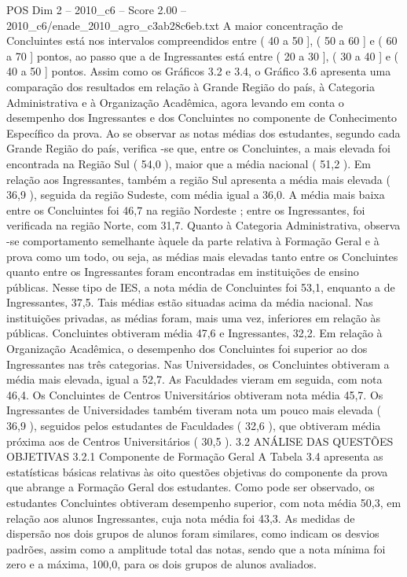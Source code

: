 \begin{textsample}{POS Dim 2 – 2010\_c6 – Score 2.00 – 2010\_c6/enade\_2010\_agro\_c3ab28c6eb.txt}
A maior concentração de Concluintes está nos intervalos compreendidos entre ( 40 a 50 ], ( 50 a 60 ] e ( 60 a 70 ] pontos, ao passo que a de Ingressantes está entre ( 20 a 30 ], ( 30 a 40 ] e ( 40 a 50 ] pontos.
Assim como os Gráficos 3.2 e 3.4, o Gráfico 3.6 apresenta uma comparação dos resultados em relação à Grande Região do país, à Categoria Administrativa e à Organização Acadêmica, agora levando em conta o desempenho dos Ingressantes e dos Concluintes no componente de Conhecimento Específico da prova.
Ao se observar as notas médias dos estudantes, segundo cada Grande Região do país, verifica -se que, entre os Concluintes, a mais elevada foi encontrada na Região Sul ( 54,0 ), maior que a média nacional ( 51,2 ).
Em relação aos Ingressantes, também a região Sul apresenta a média mais elevada ( 36,9 ), seguida da região Sudeste, com média igual a 36,0.
A média mais baixa entre os Concluintes foi 46,7 na região Nordeste ; entre os Ingressantes, foi verificada na região Norte, com 31,7.
Quanto à Categoria Administrativa, observa -se comportamento semelhante àquele da parte relativa à Formação Geral e à prova como um todo, ou seja, as médias mais elevadas tanto entre os Concluintes quanto entre os Ingressantes foram encontradas em instituições de ensino públicas.
Nesse tipo de IES, a nota média de Concluintes foi 53,1, enquanto a de Ingressantes, 37,5.
Tais médias estão situadas acima da média nacional.
Nas instituições privadas, as médias foram, mais uma vez, inferiores em relação às públicas.
Concluintes obtiveram média 47,6 e Ingressantes, 32,2.
Em relação à Organização Acadêmica, o desempenho dos Concluintes foi superior ao dos Ingressantes nas três categorias.
Nas Universidades, os Concluintes obtiveram a média mais elevada, igual a 52,7.
As Faculdades vieram em seguida, com nota 46,4.
Os Concluintes de Centros Universitários obtiveram nota média 45,7.
Os Ingressantes de Universidades também tiveram nota um pouco mais elevada ( 36,9 ), seguidos pelos estudantes de Faculdades ( 32,6 ), que obtiveram média próxima aos de Centros Universitários ( 30,5 ). 3.2 ANÁLISE DAS QUESTÕES OBJETIVAS 3.2.1 Componente de Formação Geral A Tabela 3.4 apresenta as estatísticas básicas relativas às oito questões objetivas do componente da prova que abrange a Formação Geral dos estudantes.
Como pode ser observado, os estudantes Concluintes obtiveram desempenho superior, com nota média 50,3, em relação aos alunos Ingressantes, cuja nota média foi 43,3.
As medidas de dispersão nos dois grupos de alunos foram similares, como indicam os desvios padrões, assim como a amplitude total das notas, sendo que a nota mínima foi zero e a máxima, 100,0, para os dois grupos de alunos avaliados.

\end{textsample}
